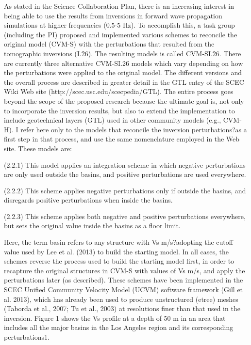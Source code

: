 \documentclass[10pt]{article}
\begin{document}
As stated in the Science Collaboration Plan, there is an increasing interest in being able to use the results from 
inversions in forward wave propagation simulations at higher frequencies (0.5-5 Hz). To accomplish this, a task group
(including the PI) proposed and implemented various schemes to reconcile the original model (CVM-S) with
the perturbations that resulted from the tomographic inversions (I.26). The resulting models is called CVM-SI.26.
There are currently three alternative CVM-SI.26 models which vary depending on how the perturbations were applied
to the original model. The different versions and the overall process are described in greater detail in the GTL
entry of the SCEC Wiki Web site (http://scec.usc.edu/scecpedia/GTL). The entire process goes beyond the scope of
the proposed research because the ultimate goal is, not only to incorporate the inversion results, but also to extend
the implementation to include geotechnical layers (GTL) used in
other community models (e.g., CVM-H). I refer here only to the
models that reconcile the inversion perturbations?as a first step
in that process, and use the same nomenclature employed in the
Web site. These models are: \par

(2.2.1) This model applies an integration scheme in which
negative perturbations are only used outside the basins, and
positive perturbations are used everywhere.\par

(2.2.2) This scheme applies negative perturbations only if
outside the basins, and disregards positive perturbations
when inside the basins.\par

(2.2.3) This scheme applies both negative and positive perturbations
everywhere, but sets the original value inside the
basins as a floor limit.\par

Here, the term basin refers to any structure with Vs 
m/s?adopting the cutoff value used by Lee et al. (2013) to build
the starting model. In all cases, the schemes reverse the process
used to build the starting model first, in order to recapture the
original structures in CVM-S with values of Vs  m/s, and
apply the perturbations later (as described). These schemes have
been implemented in the SCEC Unified Community Velocity
Model (UCVM) software framework (Gill et al. 2013), which has
already been used to produce unstructured (etree) meshes (Taborda
et al., 2007; Tu et al., 2003) at resolutions finer than that used in the inversion. Figure 1 shows the Vs profile
at a depth of 50 m in an area that includes all the major basins in the Los Angeles region and its corresponding perturbations1.\par
\end{document}
